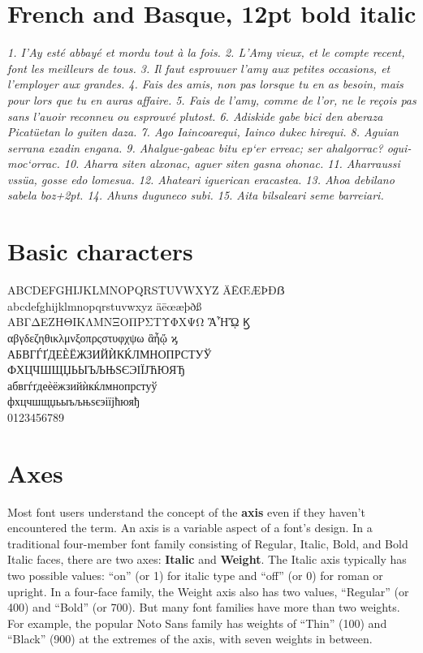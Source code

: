 \documentclass[12pt]{book}
\begin{document}
\section*{French and Basque, 12pt bold italic}

\textit{1. I'Ay esté abbayé et mordu tout à la fois.
2. L'Amy vieux, et le compte recent, font les meilleurs de tous.
3. Il faut esprouuer l'amy aux petites occasions, et l'employer aux grandes.
4. Fais des amis, non pas lorsque tu en as besoin, mais pour lors que tu en auras affaire.
5. Fais de l'amy, comme de l'or, ne le reçois pas sans l'auoir reconneu ou esprouvé plutost.
6. Adiskide gabe bici den aberaza Picatüetan
lo guiten daza. 7. Ago Iaincoarequi, Iainco dukec hirequi.
8. Aguian serrana ezadin engana.  9. Ahalgue-gabeac bitu ep‘er erreac;
ser ahalgorrac? ogui-moc‘orrac.  10. Aharra siten alxonac, aguer siten gasna
ohonac. 11. Aharraussi vssüa, gosse edo lomesua.
12. Ahateari iguerican eracastea. 13. Ahoa debilano sabela boz\kern+2pt.
14. Ahuns duguneco subi. 15. Aita bilsaleari seme barreiari.}
\pagebreak

\section*{Basic characters}

\begin{center}\Large
ABCDEFGHIJKLMNOPQRSTUVWXYZ ÄĒŒÆÞÐẞ\\
abcdefghijklmnopqrstuvwxyz äēœæþðß\\
ΑΒΓΔΕΖΗΘΙΚΛΜΝΞΟΠΡΣΤΥΦΧΨΩ ἋἮᾬ Ϗ\\
αβγδεζηθικλμνξοπρςστυφχψω ἃἦᾤ ϗ\\
АБВГЃҐДЕЀЁЖЗИЙЍКЌЛМНОПРСТУЎ\\
ФХЦЧШЩЏЬЫЪЉЊЅЄЭІЇЈЋЮЯЂ\\
абвгѓґдеѐёжзийѝкќлмнопрстуў\\
фхцчшщџьыъљњѕєэіїјћюяђ\\
0123456789
\end{center}
\pagebreak


\section*{Axes}

Most font users understand the concept of the \textbf{axis} even if they haven’t encountered the term.
An axis is a variable aspect of a font’s design. In a traditional four-member font family
consisting of Regular, Italic, Bold, and Bold Italic faces, there are two axes: \textbf{Italic}
and \textbf{Weight}. The Italic axis typically has two possible values: “on” (or 1) for italic type
and “off” (or 0) for roman or upright. In a four-face family, the Weight axis also has two
values, “Regular” (or 400) and “Bold” (or 700). But many font families have more than two weights.
For example, the popular Noto Sans family has weights of “Thin” (100) and “Black” (900) at the
extremes of the axis, with seven weights in between.
\end{document}

